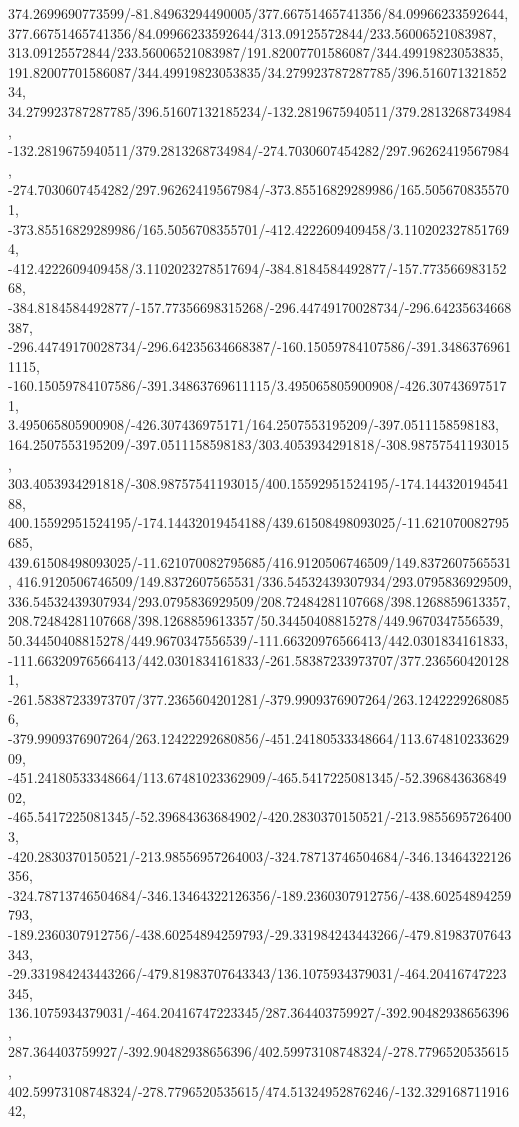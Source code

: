 {    374.2699690773599/-81.84963294490005/377.66751465741356/84.09966233592644,
    377.66751465741356/84.09966233592644/313.09125572844/233.56006521083987,
    313.09125572844/233.56006521083987/191.82007701586087/344.49919823053835,
    191.82007701586087/344.49919823053835/34.279923787287785/396.51607132185234,
    34.279923787287785/396.51607132185234/-132.2819675940511/379.2813268734984,
    -132.2819675940511/379.2813268734984/-274.7030607454282/297.96262419567984,
    -274.7030607454282/297.96262419567984/-373.85516829289986/165.5056708355701,
    -373.85516829289986/165.5056708355701/-412.4222609409458/3.1102023278517694,
    -412.4222609409458/3.1102023278517694/-384.8184584492877/-157.77356698315268,
    -384.8184584492877/-157.77356698315268/-296.44749170028734/-296.64235634668387,
    -296.44749170028734/-296.64235634668387/-160.15059784107586/-391.34863769611115,
    -160.15059784107586/-391.34863769611115/3.495065805900908/-426.307436975171,
    3.495065805900908/-426.307436975171/164.2507553195209/-397.0511158598183,
    164.2507553195209/-397.0511158598183/303.4053934291818/-308.98757541193015,
    303.4053934291818/-308.98757541193015/400.15592951524195/-174.14432019454188,
    400.15592951524195/-174.14432019454188/439.61508498093025/-11.621070082795685,
    439.61508498093025/-11.621070082795685/416.9120506746509/149.8372607565531,
    416.9120506746509/149.8372607565531/336.54532439307934/293.0795836929509,
    336.54532439307934/293.0795836929509/208.72484281107668/398.1268859613357,
    208.72484281107668/398.1268859613357/50.34450408815278/449.9670347556539,
    50.34450408815278/449.9670347556539/-111.66320976566413/442.0301834161833,
    -111.66320976566413/442.0301834161833/-261.58387233973707/377.2365604201281,
    -261.58387233973707/377.2365604201281/-379.9909376907264/263.12422292680856,
    -379.9909376907264/263.12422292680856/-451.24180533348664/113.67481023362909,
    -451.24180533348664/113.67481023362909/-465.5417225081345/-52.39684363684902,
    -465.5417225081345/-52.39684363684902/-420.2830370150521/-213.98556957264003,
    -420.2830370150521/-213.98556957264003/-324.78713746504684/-346.13464322126356,
    -324.78713746504684/-346.13464322126356/-189.2360307912756/-438.60254894259793,
    -189.2360307912756/-438.60254894259793/-29.331984243443266/-479.81983707643343,
    -29.331984243443266/-479.81983707643343/136.1075934379031/-464.20416747223345,
    136.1075934379031/-464.20416747223345/287.364403759927/-392.90482938656396,
    287.364403759927/-392.90482938656396/402.59973108748324/-278.7796520535615,
    402.59973108748324/-278.7796520535615/474.51324952876246/-132.32916871191642,
}
